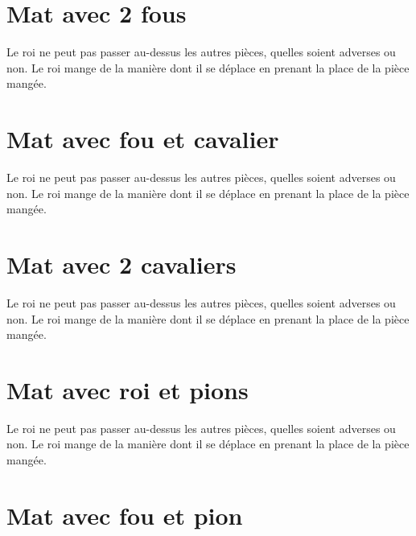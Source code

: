 \documentclass[a5paper,openany,twocolumn]{book}%
\begin{document}
\chapter{Mat avec 2 fous}
 
Le roi ne peut pas passer au-dessus les autres pièces, quelles soient adverses ou non. Le roi mange de la manière dont il se déplace en prenant la place de la pièce mangée. 


\chapter{Mat avec fou et cavalier}

Le roi ne peut pas passer au-dessus les autres pièces, quelles soient adverses ou non. Le roi mange de la manière dont il se déplace en prenant la place de la pièce mangée. 


\chapter{Mat avec 2 cavaliers}

Le roi ne peut pas passer au-dessus les autres pièces, quelles soient adverses ou non. Le roi mange de la manière dont il se déplace en prenant la place de la pièce mangée. 


\chapter{Mat avec roi et pions}
 
Le roi ne peut pas passer au-dessus les autres pièces, quelles soient adverses ou non. Le roi mange de la manière dont il se déplace en prenant la place de la pièce mangée. 


\chapter{Mat avec fou et pion}
\end{document}
